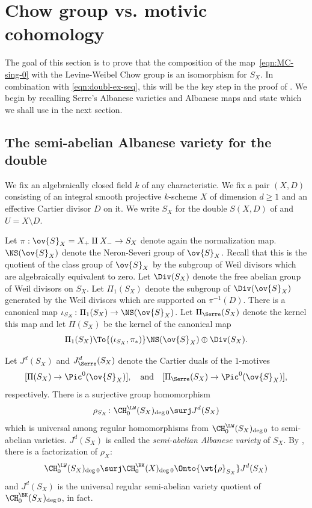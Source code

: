 \section{Chow group vs. motivic cohomology}
\label{sec:Alb-double}
The goal of this section is to prove that the composition of the map~\eqref{eqn:MC-sing-0} with the Levine-Weibel Chow group is
an isomorphism for $S_X$.
In combination with \eqref{eqn:doubl-ex-seq}, this will be the key step
in the proof of .
We begin by recalling Serre's Albanese varieties and Albanese
maps and state  which we shall use in the
next section.

\subsection{The semi-abelian Albanese variety for the double}
\label{sec:Alb-double*}
We fix an algebraically closed field $k$ of any characteristic. We fix a pair $(X,D)$ consisting of an integral smooth projective $k$-scheme $X$ of dimension $d\geq 1$ and an effective Cartier divisor $D$ on it. We write $S_X$ for the double $S(X,D)$ of
 and $U=X \setminus D$.

Let $\pi: \ov{S}_X= X_+ \amalg X_- \to S_X$ denote again the normalization map.
$\NS(\ov{S}_X)$ denote the Neron-Severi group of $\ov{S}_X$. Recall that
this is the quotient of the class group of $\ov{S}_X$ by the subgroup of
Weil divisors which are algebraically equivalent to zero.
Let $\Div(S_X)$ denote the free abelian group of Weil divisors on $S_X$.
Let $\Pi_{1}(S_X)$ denote the subgroup of ${\Div}(\ov{S}_X)$ generated
by the Weil divisors which are supported on $\pi^{-1}(D)$.
There is a canonical map $\iota_{S_X} \colon \Pi_{1}(S_X) \to
\NS(\ov{S}_X)$.
Let $\Pi_{\Serre}(S_X)$ denote the kernel this map and let $\Pi(S_X)$ be the
kernel of the canonical map
\begin{equation}\label{eqn:Weil-Pic}
\Pi_{1}(S_X) \To{(\iota_{S_X}, \pi_*)} \NS(\ov{S}_X) \oplus \Div(S_X).
\end{equation}

Let $J^d(S_X)$ and $J^{d}_{\Serre}(S_X)$ denote the Cartier duals of
the $1$-motives
\[[\Pi(S_X) \to \Pic^0(\ov{S}_X)], \quad\text{and}\quad
[\Pi_{\Serre}(S_X) \to \Pic^0(\ov{S}_X)],\]
respectively.
There is a surjective group homomorphism
\[\rho_{S_X}\colon \CH_0^{\LW}(S_X)_{\deg 0} \surj J^d(S_X)\]
which is
universal among regular homomorphisms from $\CH_0^{\LW}(S_X)_{\deg 0}$
to semi-abelian varieties. $J^d(S_X)$ is called the \emph{semi-abelian Albanese
variety} of $S_X$. By \hbox{\cite[Prop.\,9.7]{BK}}, there is a factorization
of $\rho_X$:
\begin{equation}\label{eqn:alb-lci}
\CH_0^{\LW}(S_X)_{\deg 0} \surj \CH_0^{\BK}(X)_{\deg 0}
\Onto{\wt{\rho}_{S_X}} J^d(S_X)
\end{equation}
and $J^d(S_X)$ is the universal regular semi-abelian variety quotient of
$\CH_0^{\BK}(S_X)_{\deg 0}$, in fact.

